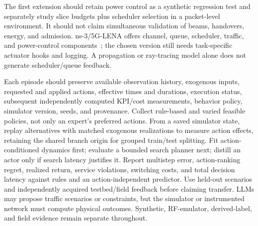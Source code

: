 The first extension should retain power control as a synthetic regression
test and separately study slice budgets plus scheduler selection in a
packet-level environment. It should not claim simultaneous validation of
beams, handovers, energy, and admission. ns-3/5G-LENA offers channel, queue,
scheduler, traffic, and power-control components~\cite{lena2026}; the chosen
version still needs task-specific actuator hooks and logging. A propagation
or ray-tracing model alone does not generate scheduler/queue feedback.

Each episode should preserve available observation history, exogenous inputs,
requested and applied actions, effective times and durations, execution status,
subsequent independently computed KPI/cost measurements, behavior policy,
simulator version, seeds, and provenance. Collect rule-based and varied
feasible policies, not only an expert's preferred actions. From a saved simulator
state, replay alternatives with matched exogenous realizations to measure action
effects, retaining the shared branch origin for grouped train/test splitting.
Fit action-conditioned dynamics first; evaluate a bounded search planner next;
distill an actor only if search latency justifies it. Report multistep error,
action-ranking regret, realized return, service violations, switching costs,
and total decision latency against rules and an action-independent predictor.
Use held-out scenarios and independently acquired testbed/field feedback before
claiming transfer. LLMs may propose traffic scenarios or constraints, but the
simulator or instrumented network must compute physical outcomes. Synthetic,
RF-emulator, derived-label, and field evidence remain separate throughout.
